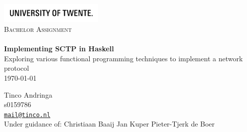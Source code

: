 \begin{titlepage}

\begin{center}

\includegraphics[width=50mm]{UT_Logo_Black_EN.jpg}\\[1.5cm]
\textsc{\Large Bachelor Assignment}\\[0.5cm]
\HRule \\[0.4cm]
{ \huge \bfseries Implementing SCTP in Haskell}\\[0.4cm]
{\large Exploring various functional programming techniques to implement a network protocol}
\HRule \\[1.5cm]
{\large \today}
\vfill
\begin{minipage}{0.4\textwidth}
\center
Tinco Andringa\\
s0159786\\
\href{mailto:mail@tinco.nl}{\nolinkurl{mail@tinco.nl}} \\[0.5cm]
\vfill
Under guidance of:
\vfill
Christiaan Baaij
\vfill
Jan Kuper
\vfill
Pieter-Tjerk de Boer


\begin{flushleft} \large
\end{flushleft}
\end{minipage}
\end{center}
\end{titlepage}
